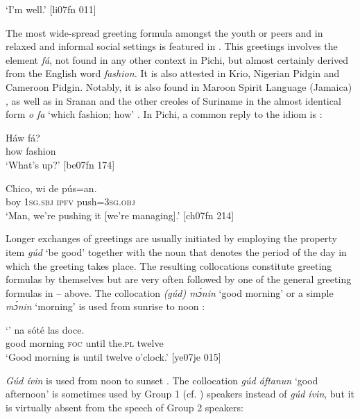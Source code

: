 \glt ‘I’m well.’ [li07fn 011]
\z

The most wide-spread greeting formula amongst the youth or peers and in relaxed and informal social settings is featured in . This greetings involves the element \textit{fá}, not found in any other context in Pichi, but almost certainly derived from the English word \textit{fashion.} It is also attested in Krio, Nigerian Pidgin and Cameroon Pidgin. Notably, it is also found in Maroon Spirit Language (Jamaica) \citep[50]{Bilby1983}, as well as in Sranan and the other creoles of Suriname in the almost identical form \textit{o} \textit{fa} ‘which fashion; how’ \citep[50]{Wilner1994}. In Pichi, a common reply to the idiom is :


\ea%
    \label{ex:key:1688}
    \gll Háw    fá?\\
how    fashion\\

\glt ‘What’s up?’ [be07fn 174]
\z


\ea%
    \label{ex:key:1689}
    \gll Chico,  wi    de  pús=an.\\
boy    \textsc{1sg.sbj}  \textsc{ipfv}  push=\textsc{3sg.obj}\\

\glt ‘Man, we’re pushing it [we’re managing].’ [ch07fn 214]
\z

Longer exchanges of greetings are usually initiated by employing the property item \textit{gúd} ‘be good’ together with the noun that denotes the period of the day in which the greeting takes place. The resulting collocations constitute greeting formulas by themselves but are very often followed by one of the general greeting formulas in – above. The collocation \textit{(gúd) mɔ́nin} ‘good morning’ or a simple \textit{mɔ́nin} ‘morning’ is used from sunrise to noon :


\ea%
    \label{ex:key:1690}
    \gll ‘’  na  sóté    las    doce.\\
good  morning  \textsc{foc}  until  the.\textsc{pl}  twelve\\

\glt ‘Good morning is until twelve o’clock.’ [ye07je 015]
\z

\textit{Gúd ívin} is used from noon to sunset . The collocation \textit{gúd áftanun} ‘good afternoon’ is sometimes used by Group 1 (cf. ) speakers instead of \textit{gúd ívin}, but it is virtually absent from the speech of Group 2 speakers:


